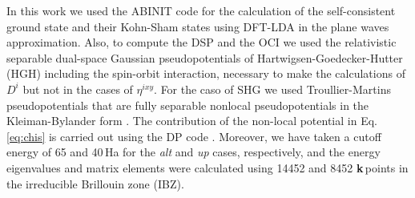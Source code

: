 \documentclass[aps,pra,11pt,tightenlines,showpacs,superscriptaddress,groupedaddress]{revtex4-1}
\newcommand{\ea}{$\eta^{ixy}$}
\begin{document}
In this work we used the ABINIT code \cite{torrent2008implementation} for the
calculation of the self-consistent ground state and their Kohn-Sham states
using DFT-LDA in the plane waves approximation. Also, to compute the DSP
and the OCI we used the relativistic separable dual-space Gaussian
pseudopotentials of Hartwigsen-Goedecker-Hutter (HGH)
\cite{hartwigsen1998relativistic} including the spin-orbit interaction,
necessary to make the calculations of $D^{i} $ but not in the cases of {\ea}.
For the caso of SHG we used Troullier-Martins pseudopotentials
\cite{troullier1991efficient} that are fully separable nonlocal
pseudopotentials in the Kleiman-Bylander form \cite{kleinman1982efficacious}.
The contribution of the non-local potential in Eq. \ref{eq:chis} is carried out
using the DP code \cite{olevanoDP}. Moreover, we have taken a cutoff energy of
65 and 40\,Ha for the \emph{alt} and \emph{up} cases, respectively, and
the energy eigenvalues and matrix elements were calculated using 14452 and 8452
\textbf{k}\,points in the irreducible Brillouin zone (IBZ).
\end{document}
